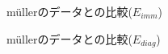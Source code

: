 \begin{figure}[htbp]
  \begin{center}
  \end{center}
  \caption{m\"{u}llerのデータとの比較($E_{imm}$)}
  \label{fig:compare_7}
\end{figure}
\begin{figure}[htbp]
  \begin{center}
  \end{center}
  \caption{m\"{u}llerのデータとの比較($E_{diag}$)}
  \label{fig:compare_8}
\end{figure}

